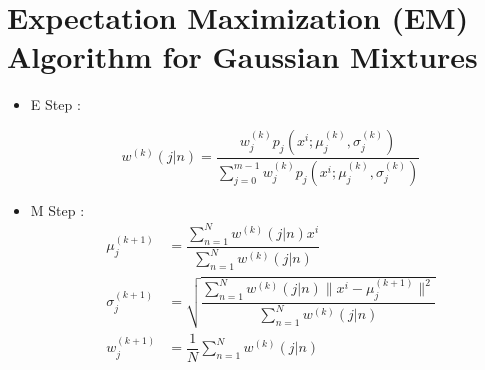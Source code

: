 \chapter{Expectation Maximization (EM) Algorithm for Gaussian Mixtures}
\label{a:em}

\begin{itemize}
\item E Step :

\begin{equation}
w^{(k)}(j|n)= \displaystyle \dfrac{w_{j}^{(k)}p_{j}(x^i;\mu_{j}^{(k)},\sigma_{j}^{(k)})}{ \displaystyle \sum_{j=0}^{m-1}w_{j}^{(k)} p_{j}(x^i;\mu_{j}^{(k)},\sigma_{j}^{(k)})}
\end{equation}
\item M Step :
\begin{equation}
\begin{aligned}
\mu_{j}^{(k+1)} &=  \dfrac{\displaystyle \sum_{n=1}^{N}w^{(k)}(j|n)x^i}{\displaystyle \sum_{n=1}^{N}w^{(k)}(j|n)}\\
\sigma_{j}^{(k+1)} &=  \sqrt{ \dfrac{\displaystyle \sum_{n=1}^{N}w^{(k)}(j|n)\|x^i-\mu_{j}^{(k+1)}\|^2}{\displaystyle \sum_{n=1}^{N}w^{(k)}(j|n)}}\\
w_{j}^{(k+1)} &=  \dfrac{1}{N} \displaystyle \sum_{n=1}^{N}w^{(k)}(j|n)
\end{aligned}
\end{equation}
\end{itemize}